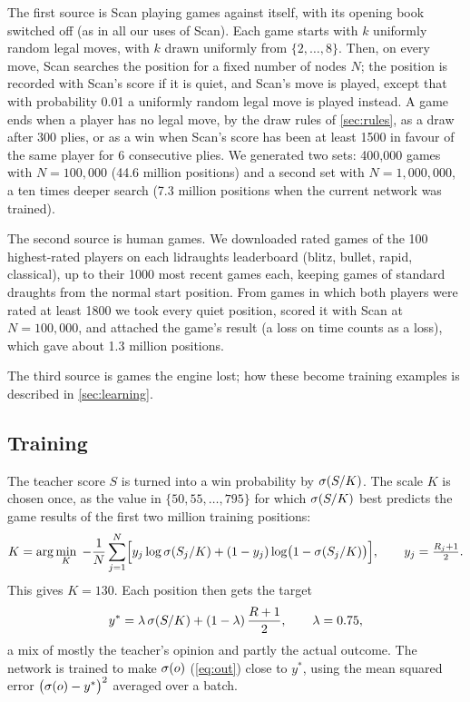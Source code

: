 The first source is Scan playing games against itself, with its opening book
switched off (as in all our uses of Scan). Each game starts with $k$ uniformly
random legal moves, with $k$ drawn uniformly from $\{2,\dots,8\}$. Then, on every
move, Scan searches the position for a fixed number of nodes $N$; the position is
recorded with Scan's score if it is quiet, and Scan's move is played, except that
with probability 0.01 a uniformly random legal move is played instead. A game
ends when a player has no legal move, by the draw rules of \cref{sec:rules}, as a
draw after 300 plies, or as a win when Scan's score has been at least 1500 in
favour of the same player for 6 consecutive plies. We generated two sets: 400{,}000
games with $N=100{,}000$ (44.6 million positions) and a second set with
$N=1{,}000{,}000$, a ten times deeper search (7.3 million positions when the
current network was trained).

The second source is human games. We downloaded rated games of the 100
highest-rated players on each lidraughts leaderboard (blitz, bullet, rapid,
classical), up to their 1000 most recent games each, keeping games of standard
draughts from the normal start position. From games in which both players were
rated at least 1800 we took every quiet position, scored it with Scan at
$N=100{,}000$, and attached the game's result (a loss on time counts as a loss),
which gave about 1.3 million positions.

The third source is games the engine lost; how these become training examples is
described in \cref{sec:learning}.

\subsection{Training}\label{sec:training}

The teacher score $S$ is turned into a win probability by $\sigma(S/K)$. The
scale $K$ is chosen once, as the value in $\{50, 55, \dots, 795\}$ for which
$\sigma(S/K)$ best predicts the game results of the first two million training
positions:
\begin{equation}\label{eq:k}
  K = \arg\min_{K} \; -\frac{1}{N}\sum_{j=1}^{N}
      \Bigl[ y_j \log \sigma(S_j/K) + (1-y_j) \log\bigl(1-\sigma(S_j/K)\bigr) \Bigr],
  \qquad y_j = \tfrac{R_j+1}{2}.
\end{equation}
This gives $K=130$. Each position then gets the target
\begin{equation}\label{eq:target}
  y^{*} = \lambda\, \sigma(S/K) + (1-\lambda)\, \frac{R+1}{2}, \qquad \lambda = 0.75,
\end{equation}
a mix of mostly the teacher's opinion and partly the actual outcome. The network
is trained to make $\sigma(o)$ (\cref{eq:out}) close to $y^{*}$, using the mean
squared error $\bigl(\sigma(o)-y^{*}\bigr)^2$ averaged over a batch.

